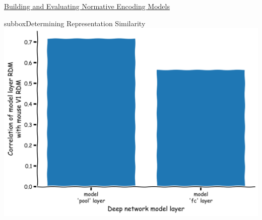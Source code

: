 \begin{textbox}{\href{https://compneuro.neuromatch.io/tutorials/W1D5_DeepLearning/student/W1D5_Tutorial3.html}{Building and Evaluating Normative Encoding Models } }
\begin{subbox}{subbox}{Determining Representation Similarity}
\centering
\includegraphics[scale=0.10]{Figures/DL/DLFigure5.png}

\end{subbox}
\end{textbox}

